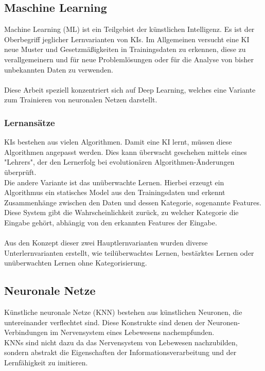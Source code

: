 \documentclass[12pt,oneside,a4paper,parskip]{scrbook}
\begin{document}
\subsection{Maschine Learning}
Machine Learning (ML) ist ein Teilgebiet der künstlichen Intelligenz. Es ist der Oberbegriff jeglicher Lernvarianten von KIs. Im Allgemeinen versucht eine KI neue Muster und Gesetzmäßigkeiten in Trainingsdaten zu erkennen, diese zu verallgemeinern und für neue Problemlösungen oder für die Analyse von bisher unbekannten Daten zu verwenden\cite{EliminateHumanBias}.
\\\\Diese Arbeit speziell konzentriert sich auf Deep Learning, welches eine Variante zum Trainieren von neuronalen Netzen darstellt.
\subsubsection{Lernansätze}
KIs bestehen aus vielen Algorithmen. Damit eine KI lernt, müssen diese Algorithmen angepasst werden. Dies kann überwacht geschehen mittels eines "Lehrers", der den Lernerfolg bei evolutionären Algorithmen-Änderungen überprüft.\\
Die andere Variante ist das unüberwachte Lernen. Hierbei erzeugt ein Algorithmus ein statisches Model aus den Trainingsdaten und erkennt Zusammenhänge zwischen den Daten und dessen Kategorie, sogenannte Features. Diese System gibt die Wahrscheinlichkeit zurück, zu welcher Kategorie die Eingabe gehört, abhängig von den erkannten Features der Eingabe.\\\\
Aus den Konzept dieser zwei Hauptlernvarianten wurden diverse Unterlernvarianten erstellt, wie teilüberwachtes Lernen, bestärktes Lernen oder unüberwachten Lernen ohne Kategorisierung.
\subsection{Neuronale Netze}
Künstliche neuronale Netze (KNN) bestehen aus künstlichen Neuronen, die untereinander verflechtet sind. Diese Konstrukte sind denen der Neuronen-Verbindungen im Nervensystem eines Lebewesens nachempfunden. \\
KNNs sind nicht dazu da das Nervensystem von Lebewesen nachzubilden, sondern abstrakt die Eigenschaften der Informationsverarbeitung und der Lernfähigkeit zu imitieren.
\end{document}
